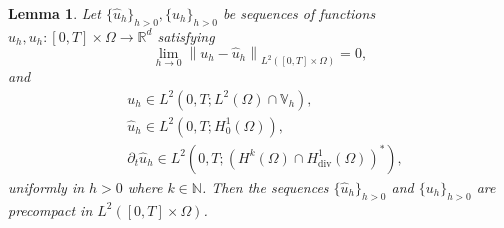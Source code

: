 \documentclass[10pt,letterpaper]{amsart}
\newcommand{\R}{\mathbb{R}}
\newcommand{\N}{\mathbb{N}}
\newcommand{\hu}{\widehat{u}}
\newcommand\norm[1]{\left\lVert#1\right\rVert}
\newcommand{\Div}{\operatorname{div}}
\newcommand{\dom}{\Omega}
\newcommand{\Vh}{\mathbb{V}_h}
\newtheorem{lemma}{Lemma}[section]
\theoremstyle{definition}{\newtheorem{definition}[lemma]{Definition}}
\numberwithin{equation}{section}
\begin{document}
\begin{lemma}
	\label{lem:aubinlionsmodified}
	Let  $\{\hu_h\}_{h>0}, \{u_h\}_{h>0}$ be  sequences of functions $\hu_h,u_h: [0,T]\times\dom\to \R^d$ satisfying
	\begin{equation}\label{eq:samelimit}
		\lim_{h\to 0}\norm{ u_h-\hu_h}_{L^2([0,T]\times \dom)}=0,	
		\end{equation}
	and
	\begin{equation}
		\label{eq:aprioriAL}\begin{split}
			& u_h\in L^2(0,T;L^2(\dom)\cap \Vh),\\
			&\hu_h\in  L^2(0,T;H^1_0(\dom)),\\
			&\partial_t \hu_h\in L^2(0,T;(H^k(\dom)\cap H^1_{\Div}(\dom))^*),	
		\end{split}
	\end{equation}
	uniformly in $h>0$ where $k\in \N$. Then the sequences $\{\hu_h\}_{h>0}$ and $\{u_h\}_{h>0}$ are precompact in $L^2([0,T]\times\dom)$.
\end{lemma}
\end{document}
